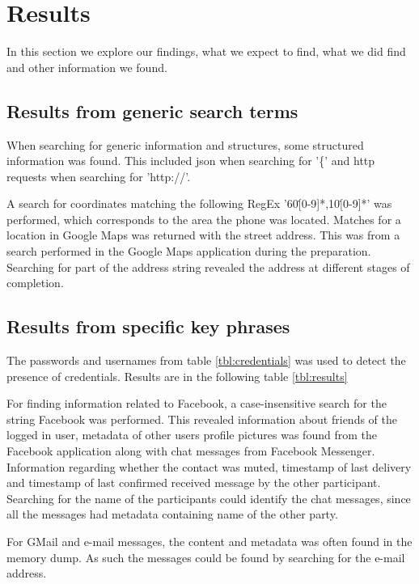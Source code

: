 \section{Results}
In this section we explore our findings, what we expect to find, what we did find and other information we found. 

\subsection{Results from generic search terms}
When searching for generic information and structures, some structured information was found. This included json when searching for '\{' and http requests when searching for 'http://'.

A search for coordinates matching the following RegEx '60\.[0-9]*,10\.[0-9]*' was performed, which corresponds to the area the phone was located. Matches for a location in Google Maps was returned with the street address. This was from a search performed in the Google Maps application during the preparation. Searching for part of the address string revealed the address at different stages of completion.


\subsection{Results from specific key phrases}
The passwords and usernames from table \ref{tbl:credentials} was used to detect the presence of credentials. Results are in the following table \ref{tbl:results} %

For finding information related to Facebook, a case-insensitive search for the string Facebook was performed. This revealed information about friends of the logged in user, metadata of other users profile pictures was found from the Facebook application along with chat messages from Facebook Messenger. Information regarding whether the contact was muted, timestamp of last delivery and timestamp of last confirmed received message by the other participant. Searching for the name of the participants could identify the chat messages, since all the messages had metadata containing name of the other party.

For GMail and e-mail messages, the content and metadata was often found in the memory dump. As such the messages could be found by searching for the e-mail address.

